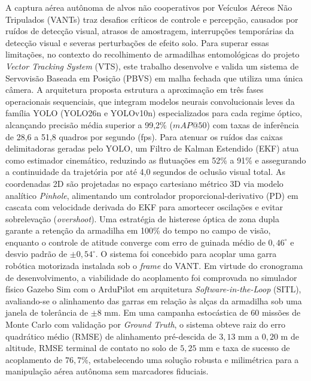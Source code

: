 A captura aérea autônoma de alvos não cooperativos por Veículos Aéreos Não Tripulados (VANTs) traz desafios críticos de controle e percepção, causados por ruídos de detecção visual, atrasos de amostragem, interrupções temporárias da detecção visual e severas perturbações de efeito solo. Para superar essas limitações, no contexto do recolhimento de armadilhas entomológicas do projeto \textit{Vector Tracking System} (VTS), este trabalho desenvolve e valida um sistema de Servovisão Baseada em Posição (PBVS) em malha fechada que utiliza uma única câmera. A arquitetura proposta estrutura a aproximação em três fases operacionais sequenciais, que integram modelos neurais convolucionais leves da família YOLO (YOLO26n e YOLOv10n) especializados para cada regime óptico, alcançando precisão média superior a 99,2\% ($mAP@50$) com taxas de inferência de 28,6 a 51,8 quadros por segundo (fps). Para atenuar os ruídos das caixas delimitadoras geradas pelo YOLO, um Filtro de Kalman Estendido (EKF) atua como estimador cinemático, reduzindo as flutuações em 52\% a 91\% e assegurando a continuidade da trajetória por até 4,0 segundos de oclusão visual total. As coordenadas 2D são projetadas no espaço cartesiano métrico 3D via modelo analítico \textit{Pinhole}, alimentando um controlador proporcional-derivativo (PD) em cascata com velocidade derivada do EKF para amortecer oscilações e evitar sobrelevação (\textit{overshoot}). Uma estratégia de histerese óptica de zona dupla garante a retenção da armadilha em 100\% do tempo no campo de visão, enquanto o controle de atitude converge com erro de guinada médio de $0{,}46^\circ$ e desvio padrão de $\pm 0{,}54^\circ$. O sistema foi concebido para acoplar uma garra robótica motorizada instalada sob o \textit{frame} do VANT. Em virtude do cronograma de desenvolvimento, a viabilidade do acoplamento foi comprovada no simulador físico Gazebo Sim com o ArduPilot em arquitetura \textit{Software-in-the-Loop} (SITL), avaliando-se o alinhamento das garras em relação às alças da armadilha sob uma janela de tolerância de $\pm 8\text{ mm}$. Em uma campanha estocástica de 60 missões de Monte Carlo com validação por \textit{Ground Truth}, o sistema obteve raiz do erro quadrático médio (RMSE) de alinhamento pré-descida de $3{,}13\text{ mm}$ a $0{,}20\text{ m}$ de altitude, RMSE terminal de contato no solo de $5{,}25\text{ mm}$ e taxa de sucesso de acoplamento de $76{,}7\%$, estabelecendo uma solução robusta e milimétrica para a manipulação aérea autônoma sem marcadores fiduciais.
